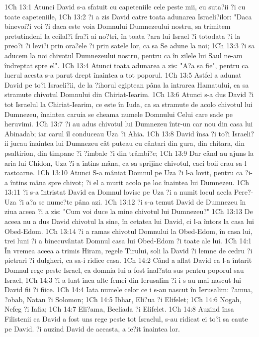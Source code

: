 1Ch 13:1  Atunci David s-a sfatuit cu capeteniile cele peste mii, cu suta?ii ?i cu toate capeteniile,
1Ch 13:2  ?i a zis David catre toata adunarea Israeli?ilor: "Daca binevoi?i voi ?i daca este voia Domnului Dumnezeului nostru, sa trimitem pretutindeni la ceilal?i fra?i ai no?tri, în toata ?ara lui Israel ?i totodata ?i la preo?i ?i levi?i prin ora?ele ?i prin satele lor, ca sa Se adune la noi;
1Ch 13:3  ?i sa aducem la noi chivotul Dumnezeului nostru, pentru ca în zilele lui Saul ne-am îndreptat spre el".
1Ch 13:4  Atunci toata adunarea a zis: "A?a sa fie", pentru ca lucrul acesta s-a parut drept înaintea a tot poporul.
1Ch 13:5  Astfel a adunat David pe to?i Israeli?ii, de la ?ihorul egiptean pâna la intrarea Hamatului, ca sa stramute chivotul Domnului din Chiriat-Iearim.
1Ch 13:6  Atunci s-a dus David ?i tot Israelul la Chiriat-Iearim, ce este în Iuda, ca sa stramute de acolo chivotul lui Dumnezeu, înaintea caruia se cheama numele Domnului Celui care sade pe heruvimi.
1Ch 13:7  ?i au adus chivotul lui Dumnezeu într-un car nou din casa lui Abinadab; iar carul îl conduceau Uza ?i Ahia.
1Ch 13:8  David însa ?i to?i Israeli?ii jucau înaintea lui Dumnezeu cât puteau cu cântari din gura, din chitara, din psaltirion, din timpane ?i ?imbale ?i din trâmbi?e;
1Ch 13:9  Dar când au ajuns la aria lui Chidon, Uza ?i-a întins mâna, ca sa sprijine chivotul, caci boii erau sa-l rastoarne.
1Ch 13:10  Atunci S-a mâniat Domnul pe Uza ?i l-a lovit, pentru ca ?i-a întins mâna spre chivot; ?i el a murit acolo pe loc înaintea lui Dumnezeu.
1Ch 13:11  ?i s-a întristat David ca Domnul lovise pe Uza ?i a numit locul acela Pere?-Uza ?i a?a se nume?te pâna azi.
1Ch 13:12  ?i s-a temut David de Dumnezeu în ziua aceea ?i a zis: "Cum voi duce la mine chivotul lui Dumnezeu?"
1Ch 13:13  De aceea nu a dus David chivotul la sine, în cetatea lui David, ci l-a întors la casa lui Obed-Edom.
1Ch 13:14  ?i a ramas chivotul Domnului la Obed-Edom, în casa lui, trei luni ?i a binecuvântat Domnul casa lui Obed-Edom ?i toate ale lui.
1Ch 14:1  În vremea aceea a trimis Hiram, regele Tirului, soli la David ?i lemne de cedru ?i pietrari ?i dulgheri, ca sa-i ridice casa.
1Ch 14:2  Când a aflat David ca l-a întarit Domnul rege peste Israel, ca domnia lui a fost înal?ata sus pentru poporul sau Israel,
1Ch 14:3  ?i-a luat înca alte femei din Ierusalim ?i i s-au mai nascut lui David fii ?i fiice.
1Ch 14:4  Iata numele celor ce i s-au nascut în Ierusalim: ?amua, ?obab, Natan ?i Solomon;
1Ch 14:5  Ibhar, Eli?ua ?i Elifelet;
1Ch 14:6  Nogah, Nefeg ?i Iafia;
1Ch 14:7  Eli?ama, Beeliada ?i Elifelet.
1Ch 14:8  Auzind însa Filistenii ca David a fost uns rege peste tot Israelul, s-au ridicat ei to?i sa caute pe David. ?i auzind David de aceasta, a ie?it înaintea lor.
